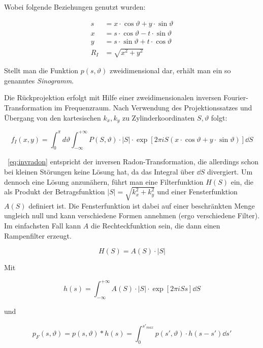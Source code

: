\documentclass[slug=PET, room=Andreas-Schubert-Bau\,\ 424A,
supervisor=Carsten\ Bittrich, coursedate=10.\ 01.\ 2020, ngerman]{../../Lab_Report_LaTeX/lab_report}
\begin{document}
Wobei folgende Beziehungen genutzt wurden:

\begin{align}
        s &= x \cdot \cos\vartheta + y \cdot \sin\vartheta \\
        x &= s \cdot \cos \vartheta - t \cdot \sin \vartheta \\
        y &= s \cdot \sin\vartheta + t \cdot \cos\vartheta \\
        R_I &= \sqrt{x^2 + y^2}
\end{align}

Stellt man die Funktion \(p(s, \vartheta)\) zweidimensional dar, erhält man ein so genanntes
\emph{Sinogramm}.

Die Rückprojektion erfolgt mit Hilfe einer zweidimensionalen inversen Fourier-Transformation im
Frequenzraum. Nach Verwendung des Projektionssatzes und Übergang von den kartesischen \(k_x, k_y\)
zu Zylinderkoordinaten \(S, \vartheta\) folgt:

\begin{equation}\label{eq:invradon}
        f_I(x,y) = \int_{0}^{\pi} d\vartheta \int_{-\infty}^{+\infty}
        P(S, \vartheta) \cdot |S| \cdot \exp[2\pi i S(x \cdot
        \cos\vartheta + y \cdot \sin\vartheta)] \dd{S}
\end{equation}

~\eqref{eq:invradon} entspricht der inversen Radon-Transformation, die
allerdings schon bei kleinen St\"orungen keine Lösung
hat, da das Integral über \(\dd{S}\) divergiert.
Um dennoch eine Lösung anzunähern, führt man eine Filterfunktion \(H(S)\) ein, die als Produkt der
Betragsfunktion \(|S| = \sqrt{k_x^2+k_y^2}\) und einer Fensterfunktion
\(A(S)\) definiert ist. Die Fensterfunktion ist dabei auf einer
beschr\"ankten Menge ungleich null und kann verschiedene Formen
annehmen (ergo verschiedene Filter). Im einfachsten Fall kann \(A\)
die Rechteckfunktion sein, die dann einen Rampenfilter erzeugt.

\begin{equation}\label{eq:filterfkt}
        H(S) = A(S) \cdot |S|
\end{equation}

Mit

\begin{equation}\label{eq:filterkern}
        h(s) = \int_{-\infty}^{+\infty} A(S) \cdot |S| \cdot \exp[2\pi i Ss] \dd{S}
\end{equation}

und

\begin{equation}\label{eq:gefltdaten}
        p_F(s, \vartheta) = p(s, \vartheta) * h(s) = \int_{0}^{s'_{max}} p(s', \vartheta) \cdot h(s-s') \dd{s}'
\end{equation}
\end{document}
